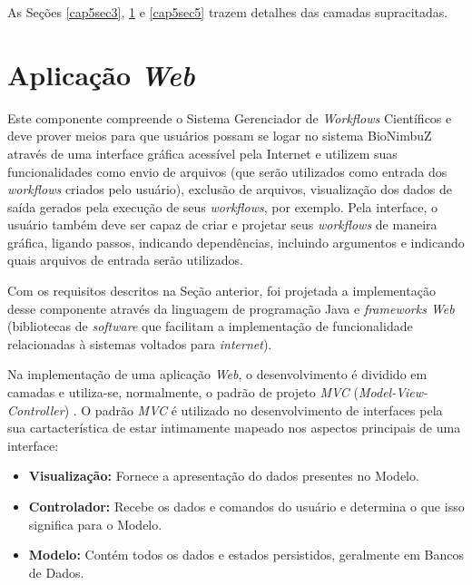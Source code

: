 As Seções \ref{cap5sec3}, \ref{cap5sec4} e \ref{cap5sec5} trazem detalhes das camadas supracitadas.

\section{Aplicação \textit{Web}} \label{cap5sec4}
    
	Este componente compreende o Sistema Gerenciador de \textit{Workflows} Científicos e deve prover meios para que usuários possam se logar no sistema BioNimbuZ através de uma interface gráfica acessível pela Internet e utilizem suas funcionalidades como envio de arquivos (que serão utilizados como entrada dos \textit{workflows} criados pelo usuário), exclusão de arquivos, visualização dos dados de saída gerados pela execução de seus \textit{workflows}, por exemplo. Pela interface, o usuário também deve ser capaz de criar e projetar seus \textit{workflows} de maneira gráfica, ligando passos, indicando dependências, incluindo argumentos e indicando quais arquivos de entrada serão utilizados.
    
Com os requisitos descritos na Seção anterior, foi projetada a implementação desse componente através da linguagem de programação Java e \textit{frameworks Web} (bibliotecas de \textit{software} que facilitam a implementação de funcionalidade relacionadas à sistemas voltados para \textit{internet}). 

Na implementação de uma aplicação \textit{Web}, o desenvolvimento é dividido em camadas e utiliza-se, normalmente, o padrão de projeto \textit{MVC} (\textit{Model-View-Controller}) \cite{design_patterns}. O padrão \textit{MVC} é utilizado no desenvolvimento de interfaces pela sua cartacterística de estar intimamente mapeado nos aspectos principais de uma interface: 

\begin{itemize}
	\item \textbf{Visualização:} Fornece a apresentação do dados presentes no Modelo.
    \item \textbf{Controlador:} Recebe os dados e comandos do usuário e determina o que isso significa para o Modelo.
    \item \textbf{Modelo:} Contém todos os dados e estados persistidos, geralmente em Bancos de Dados.
\end{itemize}

